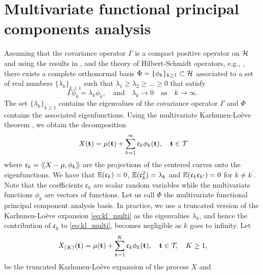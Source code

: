 \section{Multivariate functional principal components analysis} %
\label{sec:functional_principal_components_analysis}

Assuming that the covariance operator $\Gamma$ is a compact positive operator on $\mathcal{H}$ and using the results in \cite{happMultivariateFunctionalPrincipal2018a}, and the theory of Hilbert-Schmidt operators, e.g., \cite{reedMethodsModernMathematical1980}, there exists a complete orthonormal basis 
$\Phi = \{\phi_k\}_{k \geq 1} \subset \mathcal{H}$ associated to a set of real numbers $\{\lambda_k\}_{k \geq 1}$ such that $\lambda_1 \geq \lambda_2 \geq \dots \geq 0$ that satisfy
\begin{equation}\label{eq:eigendecomposition}
    \Gamma \phi_k = \lambda_k \phi_k, \quad\text{and}\quad \lambda_k \longrightarrow 0 \quad\text{as}\quad k \longrightarrow \infty.
\end{equation}
The set $\{\lambda_k\}_{k \geq 1}$ contains the eigenvalues of the covariance operator $\Gamma$ and $\Phi$ contains the associated eigenfunctions. Using the multivariate Karhunen-Loève theorem \citep{happMultivariateFunctionalPrincipal2018a}, we obtain the decomposition
\begin{equation}\label{eq:kl_multi}
    X(\mathbf{t}) = \mu(\mathbf{t}) + \sum_{k = 1}^\infty \mathfrak{c}_k \phi_k(\mathbf{t}), \quad \mathbf{t} \in \mathcal{T}_{}
\end{equation}
where $\mathfrak{c}_{k} = \langle\!\langle X - \mu, \phi_k\rangle\!\rangle$ are the projections of the centered curves onto the eigenfunctions. We have that $\mathbb{E}(\mathfrak{c}_{k}) = 0$, $\mathbb{E}(\mathfrak{c}_{k}^2) = \lambda_k$ and $\mathbb{E}(\mathfrak{c}_{k}\mathfrak{c}_{k^\prime}) = 0$ for $k \neq k^\prime$. Note that the coefficients $\mathfrak{c}_k$ are scalar random variables while the multivariate functions $\phi_k$ are vectors of functions. Let us call $\Phi$ the multivariate functional principal component analysis basis. In practice, we use a truncated version of the Karhunen-Loève expansion \eqref{eq:kl_multi} as the eigenvalues $\lambda_k$, and hence the contribution of $\mathfrak{c}_k$ to \eqref{eq:kl_multi}, becomes negligible as $k$ goes to infinity. Let
\begin{equation}\label{eq:kl_multi_trunc}
    X_{\lceil K \rceil}(\mathbf{t}) = \mu(\mathbf{t}) + \sum_{k = 1}^K \mathfrak{c}_k \phi_k(\mathbf{t}), \quad \mathbf{t} \in \mathcal{T}_{}, \quad K \geq 1,
\end{equation}
be the truncated Karhunen-Loève expansion of the process $X$ and
